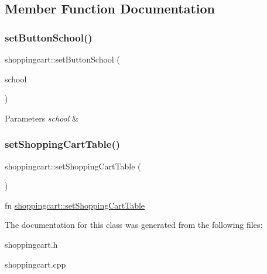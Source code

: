 \subsection{Member Function Documentation}
\mbox{\label{classshoppingcart_a7e363411f4c1fc00f4c5df86e979e561}} 
\subsubsection{\texorpdfstring{set\+Button\+School()}{setButtonSchool()}}
{\footnotesize\ttfamily shoppingcart\+::set\+Button\+School (\begin{DoxyParamCaption}\item[{Q\+String}]{school }\end{DoxyParamCaption})}


\begin{DoxyParams}{Parameters}
{\em school} & \\
\hline
\end{DoxyParams}
\mbox{\label{classshoppingcart_a4fd7f6a6c50e2f200daf3963d07e614d}} 
\subsubsection{\texorpdfstring{set\+Shopping\+Cart\+Table()}{setShoppingCartTable()}}
{\footnotesize\ttfamily shoppingcart\+::set\+Shopping\+Cart\+Table (\begin{DoxyParamCaption}{ }\end{DoxyParamCaption})}

fn \hyperlink{classshoppingcart_a4fd7f6a6c50e2f200daf3963d07e614d}{shoppingcart\+::set\+Shopping\+Cart\+Table} 

The documentation for this class was generated from the following files\+:\begin{DoxyCompactItemize}
\item 
shoppingcart.\+h\item 
shoppingcart.\+cpp\end{DoxyCompactItemize}
